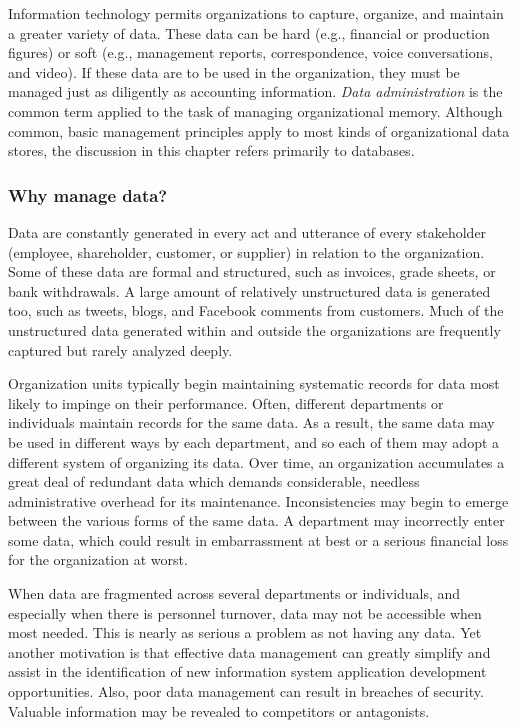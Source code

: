\documentclass[
]{article}
\begin{document}
Information technology permits organizations to capture, organize, and
maintain a greater variety of data. These data can be hard (e.g.,
financial or production figures) or soft (e.g., management reports,
correspondence, voice conversations, and video). If these data are to be
used in the organization, they must be managed just as diligently as
accounting information. \emph{Data administration} is the common term applied
to the task of managing organizational memory. Although common, basic
management principles apply to most kinds of organizational data stores,
the discussion in this chapter refers primarily to databases.

\hypertarget{why-manage-data}{%
\subsubsection*{Why manage data?}\label{why-manage-data}}

Data are constantly generated in every act and utterance of every
stakeholder (employee, shareholder, customer, or supplier) in relation
to the organization. Some of these data are formal and structured, such
as invoices, grade sheets, or bank withdrawals. A large amount of
relatively unstructured data is generated too, such as tweets, blogs,
and Facebook comments from customers. Much of the unstructured data
generated within and outside the organizations are frequently captured
but rarely analyzed deeply.

Organization units typically begin maintaining systematic records for
data most likely to impinge on their performance. Often, different
departments or individuals maintain records for the same data. As a
result, the same data may be used in different ways by each department,
and so each of them may adopt a different system of organizing its data.
Over time, an organization accumulates a great deal of redundant data
which demands considerable, needless administrative overhead for its
maintenance. Inconsistencies may begin to emerge between the various
forms of the same data. A department may incorrectly enter some data,
which could result in embarrassment at best or a serious financial loss
for the organization at worst.

When data are fragmented across several departments or individuals, and
especially when there is personnel turnover, data may not be accessible
when most needed. This is nearly as serious a problem as not having any
data. Yet another motivation is that effective data management can
greatly simplify and assist in the identification of new information
system application development opportunities. Also, poor data management
can result in breaches of security. Valuable information may be revealed
to competitors or antagonists.
\end{document}
